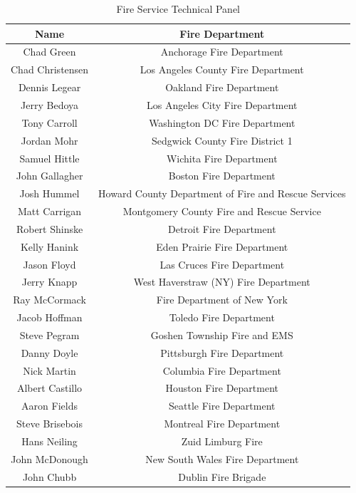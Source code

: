 \documentclass{article}
\begin{document}
\begin{table}[H]
	\centering
	\caption{Fire Service Technical Panel}
	\begin{tabular}{|c|c|}
		\hline
		\bf{Name} & \bf{Fire Department} \\ \hline \hline
		Chad Green & Anchorage Fire Department \\ \hline
		Chad Christensen & Los Angeles County Fire Department \\ \hline
		Dennis Legear & Oakland Fire Department \\ \hline
		Jerry Bedoya & Los Angeles City Fire Department \\ \hline
		Tony Carroll & Washington DC Fire Department \\ \hline
		Jordan Mohr & Sedgwick County Fire District 1 \\ \hline
		Samuel Hittle & Wichita Fire Department \\ \hline
		John Gallagher & Boston Fire Department \\ \hline
		Josh Hummel & Howard County Department of Fire and Rescue Services \\ \hline
		Matt Carrigan & Montgomery County Fire and Rescue Service \\ \hline
		Robert Shinske & Detroit Fire Department \\ \hline
		Kelly Hanink & Eden Prairie Fire Department \\ \hline
		Jason Floyd & Las Cruces Fire Department \\ \hline
		Jerry Knapp & West Haverstraw (NY) Fire Department \\ \hline
		Ray McCormack & Fire Department of New York \\ \hline
		Jacob Hoffman & Toledo Fire Department \\ \hline
		Steve Pegram & Goshen Township Fire and EMS \\ \hline
		Danny Doyle & Pittsburgh Fire Department \\ \hline
		Nick Martin & Columbia Fire Department \\ \hline
		Albert Castillo & Houston Fire Department \\ \hline
		Aaron Fields & Seattle Fire Department \\ \hline
		Steve Brisebois & Montreal Fire Department \\ \hline
		Hans Neiling & Zuid Limburg Fire \\ \hline
		John McDonough & New South Wales Fire Department \\ \hline
		John Chubb & Dublin Fire Brigade \\ \hline		 		  
	\end{tabular}
	\label{tab:TechPanelList}
\end{table}
\end{document}
